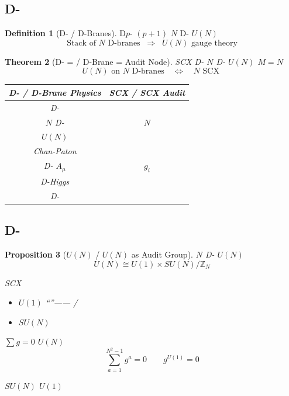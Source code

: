 \documentclass[12pt,a4paper]{article}
\theoremstyle{plain}
\newtheorem{theorem}{ Theorem}[section]
\newtheorem{proposition}[theorem]{ Proposition}
\theoremstyle{definition}
\newtheorem{definition}[theorem]{ Definition}
\newcommand{\Z}{\mathbb{Z}}
\begin{document}
\subsection{D-}

\begin{definition}[D- / D-Branes]
D$p$- $(p+1)$ 
 $N$  D- $U(N)$ 
\begin{equation}
    \text{Stack of } N \text{ D-branes} \;\; \Longrightarrow \;\; U(N) \text{ gauge theory}
\end{equation}
\end{definition}

\begin{theorem}[D- =  / D-Brane = Audit Node]
\label{thm:dbrane_audit}
 SCX  D-\textbf{}
 $N$  D- $U(N)$  $M = N$ 
\begin{equation}
    U(N) \text{ on } N \text{ D-branes}
    \quad \Longleftrightarrow \quad
    \text{$N$  SCX }
\end{equation}

\textbf{}
\begin{center}
\begin{tabular}{c|c}
    \toprule
    \textbf{D- / D-Brane Physics} & \textbf{SCX  / SCX Audit} \\
    \midrule
     D- &  \\
    $N$  D- & $N$  \\
    $U(N)$  &  \\
     Chan-Paton  &  \\
    D- $A_\mu$ &  $g_i$ \\
    D-Higgs &  \\
     D- &  \\
    \bottomrule
\end{tabular}
\end{center}
\end{theorem}


\subsection{D-}

\begin{proposition}[$U(N)$  / $U(N)$ as Audit Group]
 $N$  D- $U(N)$ 
\begin{equation}
    U(N) \cong U(1) \times SU(N) / \Z_N
\end{equation}

 SCX 
\begin{itemize}
    \item $U(1)$ ``''——\textbf{}
    /
    \item $SU(N)$ \textbf{}
    
\end{itemize}

$\sum g = 0$  $U(N)$ 
\begin{equation}
    \sum_{a=1}^{N^2-1} g^a = 0 \quad \text{} \quad g^{U(1)} = 0
\end{equation}

 $SU(N)$ $U(1)$ 
\end{proposition}
\end{document}
